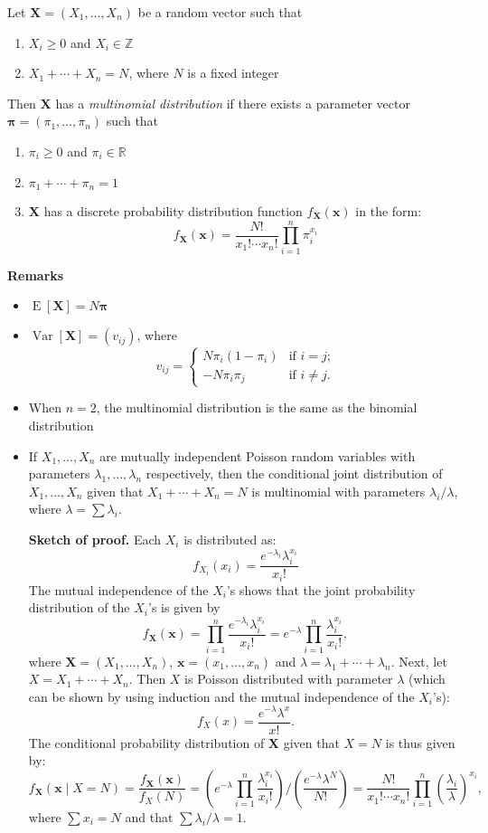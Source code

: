 \documentclass[12pt]{article}
\begin{document}
Let $\textbf{X}=(X_1,\ldots,X_n)$ be a random vector such that 
\begin{enumerate}
\item $X_i\geq 0$ and $X_i\in\mathbb{Z}$
\item $X_1+\cdots+X_n=N$, where $N$ is a fixed integer
\end{enumerate}
Then $\textbf{X}$ has a \emph{multinomial distribution} if there exists a parameter vector $\boldsymbol{\pi}=(\pi_1,\ldots,\pi_n)$ such that 
\begin{enumerate}
\item $\pi_i\geq 0$ and $\pi_i\in\mathbb{R}$
\item $\pi_1+\cdots+\pi_n=1$
\item $\textbf{X}$ has a discrete probability distribution function $f_{\textbf{X}}(\boldsymbol{x})$ in the form:
$$f_{\textbf{X}}(\boldsymbol{x})=\frac{N!}{x_1!\cdots x_n!}\prod_{i=1}^{n}\pi_i^{x_i}$$
\end{enumerate}
\par
\textbf{Remarks}
\begin{itemize}
\item $\operatorname{E}[\textbf{X}]=N\boldsymbol{\pi}$
\item $\operatorname{Var}[\textbf{X}]=(v_{ij})$, where 
$$
v_{ij}= 
\begin{cases}
N\pi_i(1-\pi_i) & \text{if $i=j$;}\\
-N\pi_i\pi_j & \text{if $i\neq j$.}
\end{cases}
$$
\item When $n=2$, the multinomial distribution is the same as the binomial distribution
\item If $X_1,\ldots,X_n$ are mutually independent Poisson random variables with parameters $\lambda_1,\ldots,\lambda_n$ 
respectively, then the conditional joint distribution of $X_1,\ldots,X_n$ given that $X_1+\cdots+X_n=N$ is 
multinomial with parameters $\lambda_i/\lambda$, where $\lambda=\sum\lambda_i$.
\par
\textbf{Sketch of proof.}
Each $X_i$ is distributed as:  $$f_{X_i}(x_i) = \frac{e^{-\lambda_i} \lambda_i^{x_i}}{x_i!}$$
The mutual independence of the $X_i$'s shows that the joint probability distribution of the $X_i$'s is given by  
$$f_{\textbf{X}}(\boldsymbol{x})=\prod_{i=1}^{n}\frac{e^{-\lambda_i} \lambda_i^{x_i}}{x_i!}=
e^{-\lambda}\prod_{i=1}^{n}\frac{\lambda_i^{x_i}}{x_i!},$$ where $\textbf{X}=(X_1,\ldots,X_n)$, $\boldsymbol{x}=
(x_1,\ldots,x_n)$ and $\lambda=\lambda_1+\cdots+\lambda_n$.
Next, let $X=X_1+\cdots+X_n$.  Then $X$ is Poisson distributed with parameter $\lambda$ (which can be shown by using induction and the mutual independence of the $X_i$'s):  $$f_X(x)=\frac{e^{-\lambda} \lambda^{x}}{x!}.$$  The conditional probability distribution of $\textbf{X}$ given that $X=N$ is thus given by:
$$f_{\textbf{X}}(\boldsymbol{x}\mid X=N)=\frac{f_{\textbf{X}}(\boldsymbol{x})}{f_X(N)}=(e^{-\lambda}\prod_{i=1}^{n}\frac{\lambda_i^{x_i}}{x_i!})/(\frac{e^{-\lambda} \lambda^{N}}{N!})=\frac{N!}{x_1!\cdots x_n!}\prod_{i=1}^{n}(\frac{\lambda_i}{\lambda})^{x_i},$$
where $\sum x_i=N$ and that $\sum \lambda_i/\lambda=1$.
\end{itemize}
\end{document}

